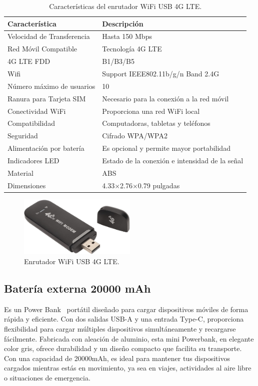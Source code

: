 \begin{table}[htbp]
\begin{center}
\caption{Características del enrutador WiFi USB 4G LTE.}
\begin{tabular}{|l|l|}
\hline
\rowcolor[HTML]{C0C0C0} 
\textbf{Característica} & \textbf{Descripción}\\ \hline
Velocidad de Transferencia &  Hasta 150 Mbps\\ \hline
Red Móvil Compatible &  Tecnología 4G LTE \\ \hline
4G LTE FDD & B1/B3/B5 \\ \hline
Wifi & Support IEEE802.11b/g/n Band 2.4G \\ \hline
Número máximo de usuarios & 10 \\ \hline
Ranura para Tarjeta SIM &  Necesario para la conexión a la red móvil \\ \hline
Conectividad WiFi & Proporciona una red WiFi local\\ \hline
Compatibilidad & Computadoras, tabletas y teléfonos \\ \hline
Seguridad & Cifrado WPA/WPA2 \\ \hline
Alimentación por batería & Es opcional y permite mayor portabilidad \\ \hline
Indicadores LED & Estado de la conexión e intensidad de la señal \\ \hline
Material & ABS \\ \hline
Dimensiones & 4.33$\times$2.76$\times$0.79 pulgadas\\ \hline
\end{tabular}
\end{center}
\end{table}

\begin{figure}[h]
    \centering
    \includegraphics[width=0.5\textwidth]{img/herramientas/enrutador_wifi.png}
    \caption{Enrutador WiFi USB 4G LTE.} \label{Img:EnrutadorWifi}
\end{figure}

\subsection{Batería externa 20000 mAh}
Es un Power Bank~\cite{misc:Powerbank} portátil diseñado para cargar dispositivos móviles de forma rápida y eficiente. Con dos salidas USB-A y una entrada Type-C, proporciona flexibilidad para cargar múltiples dispositivos simultáneamente y recargarse fácilmente. Fabricada con aleación de aluminio, esta mini Powerbank, en elegante color gris, ofrece durabilidad y un diseño compacto que facilita su transporte. Con una capacidad de 20000mAh, es ideal para mantener tus dispositivos cargados mientras estás en movimiento, ya sea en viajes, actividades al aire libre o situaciones de emergencia.


